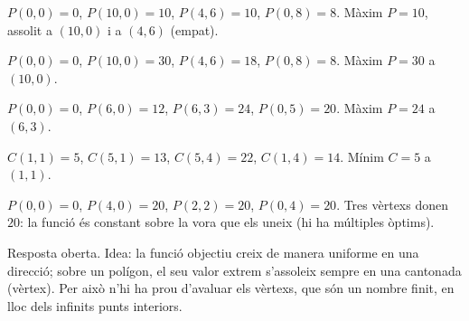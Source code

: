 \begin{solucions}
\begin{sollist}
  \item $P(0,0)=0$, $P(10,0)=10$, $P(4,6)=10$, $P(0,8)=8$. Màxim $P=10$, assolit a
        $(10,0)$ i a $(4,6)$ (empat).
  \item $P(0,0)=0$, $P(10,0)=30$, $P(4,6)=18$, $P(0,8)=8$. Màxim $P=30$ a $(10,0)$.
  \item $P(0,0)=0$, $P(6,0)=12$, $P(6,3)=24$, $P(0,5)=20$. Màxim $P=24$ a $(6,3)$.
  \item $C(1,1)=5$, $C(5,1)=13$, $C(5,4)=22$, $C(1,4)=14$. Mínim $C=5$ a $(1,1)$.
  \item $P(0,0)=0$, $P(4,0)=20$, $P(2,2)=20$, $P(0,4)=20$. Tres vèrtexs donen $20$:
        la funció és constant sobre la vora que els uneix (hi ha múltiples òptims).
  \item Resposta oberta. Idea: la funció objectiu creix de manera uniforme en una
        direcció; sobre un polígon, el seu valor extrem s'assoleix sempre en una
        cantonada (vèrtex). Per això n'hi ha prou d'avaluar els vèrtexs, que són un
        nombre finit, en lloc dels infinits punts interiors.
\end{sollist}
\end{solucions}
